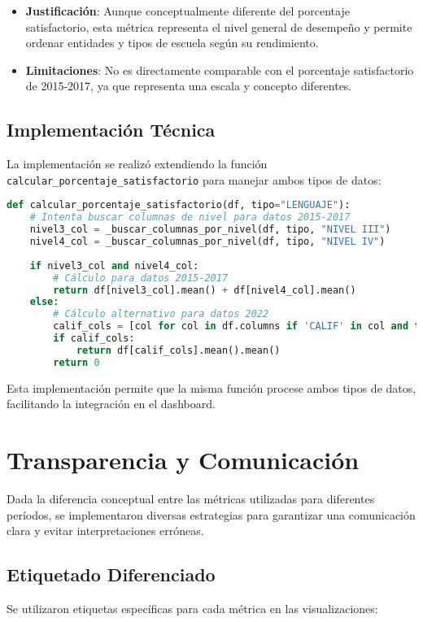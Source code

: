 \begin{itemize}
    \item \textbf{Justificación}: Aunque conceptualmente diferente del porcentaje satisfactorio, esta métrica representa el nivel general de desempeño y permite ordenar entidades y tipos de escuela según su rendimiento.
    \item \textbf{Limitaciones}: No es directamente comparable con el porcentaje satisfactorio de 2015-2017, ya que representa una escala y concepto diferentes.
\end{itemize}

\subsection{Implementación Técnica}
La implementación se realizó extendiendo la función \texttt{calcular\_porcentaje\_satisfactorio} para manejar ambos tipos de datos:

\begin{lstlisting}[language=Python, caption=Implementación de métrica alternativa para 2022]
def calcular_porcentaje_satisfactorio(df, tipo="LENGUAJE"):
    # Intenta buscar columnas de nivel para datos 2015-2017
    nivel3_col = _buscar_columnas_por_nivel(df, tipo, "NIVEL III")
    nivel4_col = _buscar_columnas_por_nivel(df, tipo, "NIVEL IV")
    
    if nivel3_col and nivel4_col:
        # Cálculo para datos 2015-2017
        return df[nivel3_col].mean() + df[nivel4_col].mean()
    else:
        # Cálculo alternativo para datos 2022
        calif_cols = [col for col in df.columns if 'CALIF' in col and tipo in col]
        if calif_cols:
            return df[calif_cols].mean().mean()
        return 0
\end{lstlisting}

Esta implementación permite que la misma función procese ambos tipos de datos, facilitando la integración en el dashboard.

\section{Transparencia y Comunicación}
Dada la diferencia conceptual entre las métricas utilizadas para diferentes períodos, se implementaron diversas estrategias para garantizar una comunicación clara y evitar interpretaciones erróneas.

\subsection{Etiquetado Diferenciado}
Se utilizaron etiquetas específicas para cada métrica en las visualizaciones:

